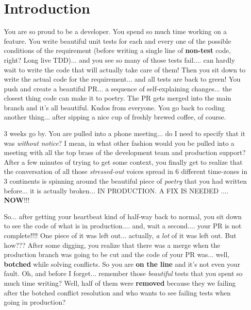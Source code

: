 
\section{Introduction}

You are so proud to be a developer. You spend so much time working on a feature. You write beautiful unit tests
for each and every one of the possible conditions of the requirement (before writing a single
line of {\bf non-test} code, right? Long live TDD)... and you see so many of those tests fail.... can hardly wait to
write the code that will actually take care of them! Then you sit down to write the actual code for the requirement...
and all tests are back to green! You push and create a beautiful PR... a sequence of self-explaining changes...
the closest thing code can make it to poetry. The PR gets merged into the main branch and it's all beautiful. Kudos
from everyone. You go back to coding another thing... after sipping a nice cup of freshly brewed coffee, of course.

3 weeks go by. You are pulled into a phone meeting... do I need to specify that it was {\it without notice}? I mean,
in what other fashion would you be pulled into a meeting with all the top brass of the development team and production
support? After a few minutes of trying to get some context, you finally get to realize that the conversation
of all those {\it stressed-out} voices spread in 6 different time-zones in 3 continents is spinning around the beautiful
piece of {\it poetry} that you had written before... it is actually broken... IN PRODUCTION. A FIX IS NEEDED .... {\bf NOW}!!!

So... after getting your heartbeat kind of half-way back to normal, you sit down to see the code of what is in production....
and, wait a second.... your PR is not complete!!!! One piece of it was left out... actually, {\it a lot} of it was left
out. But how??? After some digging, you realize that there was a merge when the production branch was going to be cut
and the code of your PR was... well, {\bf botched} while solving conflicts. So you are {\bf on the line} and it's not
even your fault. Oh, and before I forget... remember those {\it beautiful} tests that you spent so much time writing?
Well, half of them were {\bf removed} because they we failing after the botched conflict resolution and who wants to
see failing tests when going in production?

